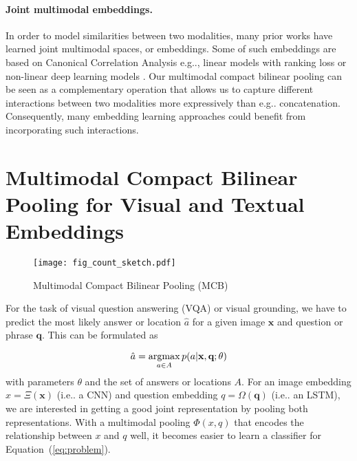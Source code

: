 \documentclass[11pt,letterpaper]{article}
\makeatletter
\DeclareRobustCommand\onedot{\futurelet\@let@token\@onedot}
\def\@onedot{\ifx\@let@token.\else.\null\fi\xspace}
\def\eg{e.g\onedot} \def\Eg{E.g\onedot}
\def\ie{i.e\onedot} \def\Ie{I.e\onedot}
\DeclareRobustCommand{\Eqnref}[1]{Equation~(\ref{#1})}
\makeatother
\begin{document}
\paragraph{Joint multimodal embeddings.}
In order to model similarities between two modalities, many prior works have learned joint multimodal spaces, or embeddings. Some of such embeddings are based on Canonical Correlation Analysis \cite{hardoon2004canonical} \eg \cite{gong14eccv,klein15cvpr,plummer15iccv}, linear models with ranking loss \cite{frome2013devise,karpathy15cvpr,socher2014grounded,weston2011wsabie} or non-linear deep learning models \cite{kiros2014multimodal,mao2014deep,ngiam2011multimodal}. Our multimodal compact bilinear pooling can be seen as a complementary operation that allows us to capture different interactions between two modalities more expressively than \eg concatenation. Consequently, many embedding learning approaches could benefit from incorporating such interactions.

\section{Multimodal Compact Bilinear Pooling for Visual and Textual Embeddings}
\label{sec:approach}


\begin{figure}[t]
\texttt{[image: fig\_count\_sketch.pdf]}
\vspace{-0.5cm}
\caption{Multimodal Compact Bilinear Pooling (MCB)}
\label{fig:count_sketch}
\end{figure}



For the task of visual question answering (VQA) or visual grounding, we have to predict the most likely answer or location $\hat{a}$ for a given image $\textbf{x}$ and question or phrase $\textbf{q}$. This can be formulated as

\newcommand*{\argmin}{\operatornamewithlimits{argmin}\limits}
\newcommand*{\argmax}{\operatornamewithlimits{argmax}\limits}

\begin{equation}
\label{eq:problem}
\hat{a}=\argmax_{a\in A}p(a|\textbf{x},\textbf{q};\theta)
\end{equation}
with parameters $\theta$ and the set of answers or locations $A$.
For an image embedding $x = \Xi(\textbf{x})$ (\ie a CNN) and question embedding $q = \Omega(\textbf{q})$ (\ie an LSTM), we are interested in getting a good joint representation by pooling both representations. With a multimodal pooling $\Phi(x, q)$ that encodes the relationship between $x$ and $q$ well, it becomes easier to learn a classifier for \Eqnref{eq:problem}. 
\end{document}

